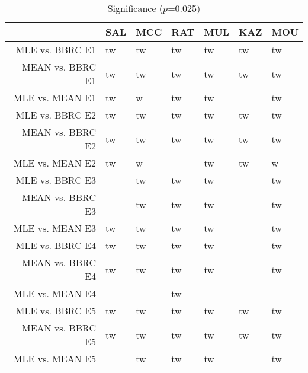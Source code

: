 \begin{table}[t]
\begin{center}
\begin{tabular}{rllllll}
  \hline
 & SAL & MCC & RAT & MUL & KAZ & MOU \\ 
  \hline
MLE vs. BBRC E1 & tw & tw & tw & tw & tw & tw \\ 
  MEAN vs. BBRC E1 & tw & tw & tw & tw & tw & tw \\ 
  MLE vs. MEAN E1 & tw & w & tw & tw &  & tw \\ 
  MLE vs. BBRC E2 & tw & tw & tw & tw & tw & tw \\ 
  MEAN vs. BBRC E2 & tw & tw & tw & tw & tw & tw \\ 
  MLE vs. MEAN E2 & tw & w &  & tw & tw & w \\ 
  MLE vs. BBRC E3 &  & tw & tw & tw &  & tw \\ 
  MEAN vs. BBRC E3 &  & tw & tw & tw &  & tw \\ 
  MLE vs. MEAN E3 & tw & tw & tw & tw &  & tw \\ 
  MLE vs. BBRC E4 & tw & tw & tw & tw &  & tw \\ 
  MEAN vs. BBRC E4 & tw & tw & tw & tw &  & tw \\ 
  MLE vs. MEAN E4 &  &  & tw &  &  &  \\ 
  MLE vs. BBRC E5 & tw & tw & tw & tw & tw & tw \\ 
  MEAN vs. BBRC E5 & tw & tw & tw & tw & tw & tw \\ 
  MLE vs. MEAN E5 &  & tw & tw & tw &  & tw \\ 
   \hline
\end{tabular}
\caption{Significance ($p$=0.025)}
\label{t:sign}
\end{center}
\end{table}
